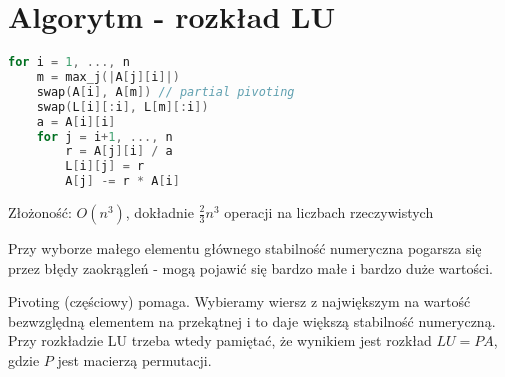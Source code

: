 \section{Algorytm - rozkład LU}
\begin{lstlisting}[language=Cpp]
for i = 1, ..., n
    m = max_j(|A[j][i]|)
    swap(A[i], A[m]) // partial pivoting
    swap(L[i][:i], L[m][:i])
    a = A[i][i]
    for j = i+1, ..., n
        r = A[j][i] / a
        L[i][j] = r
        A[j] -= r * A[i]
\end{lstlisting}
\noindent
Złożoność: \( O(n^3) \), dokładnie \( \frac{2}{3}n^3 \) operacji na liczbach rzeczywistych

\begin{warning}
	Przy wyborze małego elementu głównego stabilność numeryczna pogarsza się przez błędy zaokrągleń - mogą pojawić się bardzo małe i bardzo duże wartości.
\end{warning}

Pivoting (częściowy) pomaga. Wybieramy wiersz z największym na wartość bezwzględną elementem na przekątnej i to daje większą stabilność numeryczną. Przy rozkładzie LU trzeba wtedy pamiętać, że wynikiem jest rozkład \( LU = PA \), gdzie \( P \) jest macierzą permutacji.
